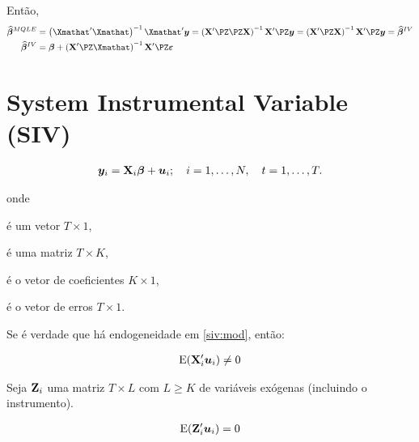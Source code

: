 \documentclass[11pt, oneside, a4paper, article]{article}
\numberwithin{equation}{section}
\begin{document}
\begin{description}
Então, 
\begin{align*}
\betavechat^{MQLE} &= \left( \Xmathat' \Xmathat \right)^{-1} \Xmathat' \yvec
= \left( \Xmat' \PZ \PZ \Xmat \right)^{-1} \Xmat' \PZ \yvec
= \left( \Xmat' \PZ \Xmat \right)^{-1} \Xmat' \PZ \yvec 
= \betavechat^{IV}
\\
\betavechat^{IV} &= \betavec + 
\left( \Xmat' \PZ \Xmathat \right)^{-1} \Xmat' \PZ \mbs{\varepsilon}
\end{align*}

\clearpage
\section{System Instrumental Variable (SIV)}

\vspace{-2 em}
\begin{align} \label{siv:mod}
\boldsymbol{y}_{i} = \mathbf{X}_{i} \boldsymbol{\beta} + \boldsymbol{u}_{i};
\quad i = 1, \dots, N,
\quad t = 1, \dots, T.
\end{align}

\noindent
onde 
\begin{description}[noitemsep]
\item[$\yvec_{i}$] é um vetor $T \times 1$,
\item[$\Xmat_{i}$] é uma matriz $T \times K$,
\item[$\betavec$] é o vetor de coeficientes $K \times 1$,
\item[$\uvec_{i}$] é o vetor de erros $T \times 1$.
\end{description}

Se é verdade que há endogeneidade em \eqref{siv:mod}, então:

\vspace{-1 em}
\begin{align*}
\text{E}(\mathbf{X}_{i}^{\prime} \boldsymbol{u}_{i}) \neq 0
\end{align*}

Seja $\mathbf{Z}_{i}$ uma matriz $T \times L$ com $L \geq K$ de variáveis exógenas (incluindo o instrumento).

\begin{hypo}
\begin{align*}
\text{E}(\mathbf{Z}_{i}' \boldsymbol{u}_{i}) = 0
\end{align*}
\end{hypo}


\end{description}
\end{document}
